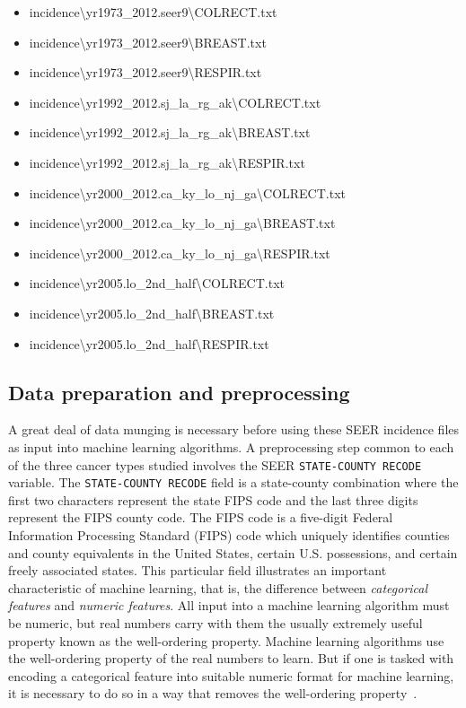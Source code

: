 \documentclass[10pt,letterpaper]{article}
\newcommand{\codewhite}[1]{\colorbox{white}{\texttt{#1}}}
\begin{document}
\begin{itemize}[noitemsep]
\item incidence\textbackslash yr1973\_2012.seer9\textbackslash COLRECT.txt
\item incidence\textbackslash yr1973\_2012.seer9\textbackslash BREAST.txt
\item incidence\textbackslash yr1973\_2012.seer9\textbackslash RESPIR.txt
\item incidence\textbackslash yr1992\_2012.sj\_la\_rg\_ak\textbackslash COLRECT.txt
\item incidence\textbackslash yr1992\_2012.sj\_la\_rg\_ak\textbackslash BREAST.txt
\item incidence\textbackslash yr1992\_2012.sj\_la\_rg\_ak\textbackslash RESPIR.txt
\item incidence\textbackslash yr2000\_2012.ca\_ky\_lo\_nj\_ga\textbackslash COLRECT.txt
\item incidence\textbackslash yr2000\_2012.ca\_ky\_lo\_nj\_ga\textbackslash BREAST.txt
\item incidence\textbackslash yr2000\_2012.ca\_ky\_lo\_nj\_ga\textbackslash RESPIR.txt
\item incidence\textbackslash yr2005.lo\_2nd\_half\textbackslash COLRECT.txt
\item incidence\textbackslash yr2005.lo\_2nd\_half\textbackslash BREAST.txt
\item incidence\textbackslash yr2005.lo\_2nd\_half\textbackslash RESPIR.txt
\end{itemize}


\subsection*{Data preparation and preprocessing}
\label{subsec:dataprep} 


A great deal of data munging is necessary before using these SEER incidence files as input into machine learning algorithms. A preprocessing step common to each of the three cancer types studied involves the SEER \codewhite{STATE-COUNTY RECODE} variable.
The \codewhite{STATE-COUNTY RECODE} field is a state-county combination where the first two characters represent the state FIPS code and the last three digits represent the FIPS county code.  The FIPS code is a five-digit Federal Information Processing Standard (FIPS) code which uniquely identifies counties and county equivalents in the United States, certain U.S. possessions, and certain freely associated states.
This particular field illustrates an important characteristic of machine learning, that is, the difference  between \textit{categorical features} and \textit{numeric features}. All input into a machine learning algorithm must be numeric, but real numbers carry with them the usually extremely useful property known as the well-ordering property. Machine learning algorithms use the well-ordering property of the real numbers to learn.
But if one is tasked with encoding a categorical feature into suitable numeric format for machine learning, it is necessary to do so in a way that removes the well-ordering property~\cite{bowles}.
\end{document}
